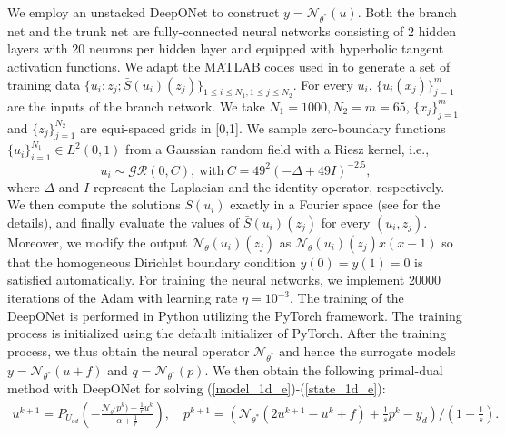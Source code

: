 \documentclass[final]{siamart171218}
\theoremstyle{remark}
\begin{document}
We employ an unstacked DeepONet to construct $y=\mathcal{N}_{\theta^*}(u)$. Both the branch net and the trunk net
are fully-connected neural networks consisting of 2 hidden layers with 20 neurons per hidden layer and equipped with hyperbolic tangent activation functions.  We adapt the MATLAB codes used in \cite{li2020FNO} to generate a set of training data $\{u_i; z_j; \bar{S}(u_i)(z_j)\}_{1\leq i\leq N_1, 1\leq j\leq N_2}$.  For every $u_i$, $\{u_i(x_j)\}_{j=1}^m$ are the inputs of the branch network. We take $N_1=1000, N_2=m=65$, $\{x_j\}_{j=1}^m$ and $\{z_j\}_{j=1}^{N_2}$ are equi-spaced grids in [0,1]. We sample zero-boundary functions $\{u_i\}^{N_1}_{i=1}\in L^2(0,1)$ from a Gaussian random field with a Riesz kernel, i.e.,
$$
u_i \sim \mathcal{GR}(0, C),~\text{with}~ C=49^2(-\Delta+49 I)^{-2.5},
$$
where $\Delta$ and $I$ represent the Laplacian and the identity operator, respectively.
We then compute the solutions $\bar{S}(u_i)$ exactly in a Fourier space (see \cite{li2020FNO} for the details), and finally evaluate the values of $\bar{S}(u_i)(z_j)$ for every $(u_i, z_j)$.  Moreover, we modify the output $\mathcal{N}_{\theta}(u_i)(z_j)$ as $\mathcal{N}_{\theta}(u_i)(z_j)x(x-1)$ so that the homogeneous Dirichlet boundary condition $y(0)=y(1)=0$ is satisfied automatically. For training the neural networks, we implement 20000 iterations of the Adam \cite{kingma2015} with learning rate $\eta=10^{-3}$.  The training of the DeepONet is performed in Python utilizing the PyTorch framework. The training process is initialized using the default initializer of PyTorch. After the training process, we thus obtain the neural operator $\mathcal{N}_{\theta^*}$ and hence the surrogate models $y=\mathcal{N}_{\theta^*}(u+f)$ and $q=\mathcal{N}_{\theta^*}(p)$. We then obtain the following primal-dual method with DeepONet for solving (\ref{model_1d_e})-(\ref{state_1d_e}):
\begin{equation}\label{pdonet_elliptic}
	\begin{aligned}
		u^{k+1}=P_{U_{ad}}\left(-\frac{\mathcal{N}_{\theta^*}{p}^k)-\frac{1}{r}u^k}{\alpha+\frac{1}{r}}\right),\quad
		p^{k+1}=(\mathcal{N}_{\theta^*}(2{u}^{k+1}-u^k+f)+\frac{1}{s}p^k-y_d)/(1+\frac{1}{s}).
	\end{aligned}
\end{equation}
\end{document}
